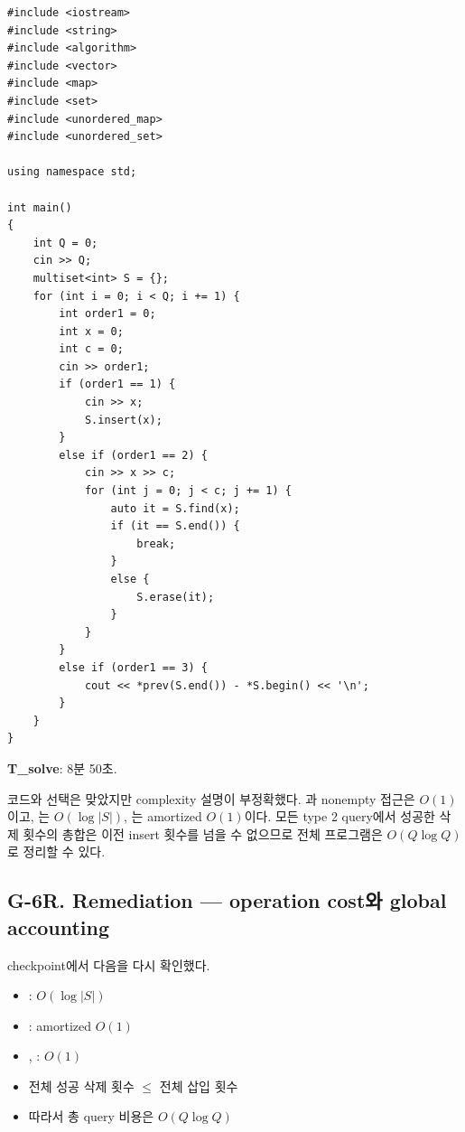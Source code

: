 \begin{answerbox}[학습자 제출 답안]
\begin{lstlisting}
#include <iostream>
#include <string>
#include <algorithm>
#include <vector>
#include <map>
#include <set>
#include <unordered_map>
#include <unordered_set>

using namespace std;

int main()
{
    int Q = 0;
    cin >> Q;
    multiset<int> S = {};
    for (int i = 0; i < Q; i += 1) {
        int order1 = 0;
        int x = 0;
        int c = 0;
        cin >> order1;
        if (order1 == 1) {
            cin >> x;
            S.insert(x);
        }
        else if (order1 == 2) {
            cin >> x >> c;
            for (int j = 0; j < c; j += 1) {
                auto it = S.find(x);
                if (it == S.end()) {
                    break;
                }
                else {
                    S.erase(it);
                }
            }
        }
        else if (order1 == 3) {
            cout << *prev(S.end()) - *S.begin() << '\n';
        }
    }
}
\end{lstlisting}

\textbf{T\_solve}: 8분 50초.
\end{answerbox}

\begin{notebox}
코드와  선택은 맞았지만 complexity 설명이 부정확했다. 과 nonempty  접근은 $O(1)$이고, 는 $O(\log |S|)$, 는 amortized $O(1)$이다. 모든 type 2 query에서 성공한 삭제 횟수의 총합은 이전 insert 횟수를 넘을 수 없으므로 전체 프로그램은 $O(Q\log Q)$로 정리할 수 있다.
\end{notebox}

\subsection{G-6R. Remediation --- operation cost와 global accounting}
checkpoint에서 다음을 다시 확인했다.
\begin{itemize}
\item {}: $O(\log |S|)$
\item {}: amortized $O(1)$
\item {}, : $O(1)$
\item 전체 성공 삭제 횟수 $\le$ 전체 삽입 횟수
\item 따라서 총 query 비용은 $O(Q\log Q)$
\end{itemize}

